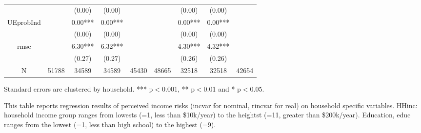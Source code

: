 \documentclass[12pt,notitlepage,onecolumn,aps,pra]{article}
\begin{document}
\begin{table}[p]
\begin{adjustbox}{width=\textwidth}
\begin{threeparttable}
\begin{tabular}{ccccccccc}
                 &           &    (0.00) &     (0.00) &             &           &     (0.00) &      (0.00) &              \\
UEprobInd        &           &   0.00*** &    0.00*** &             &           &    0.00*** &     0.00*** &              \\
                 &           &    (0.00) &     (0.00) &             &           &     (0.00) &      (0.00) &              \\
rmse             &           &   6.30*** &    6.32*** &             &           &    4.30*** &     4.32*** &              \\
                 &           &    (0.27) &     (0.27) &             &           &     (0.26) &      (0.26) &              \\
N                &     51788 &     34589 &      34589 &       45430 &     48665 &      32518 &       32518 &        42654 \\
\bottomrule
\end{tabular}
\begin{tablenotes}\item Standard errors are clustered by household. *** p$<$0.001, ** p$<$0.01 and * p$<$0.05. 
\item This table reports regression results of perceived income risks (incvar for nominal, rincvar for real) on household specific variables. HHinc: household income group ranges from lowests (=1, less than \$10k/year) to the heightst (=11, greater than \$200k/year). Education, educ ranges from the lowest (=1, less than high school) to the highest (=9).
\end{tablenotes}
\end{threeparttable}
\end{adjustbox}
\end{table}
\end{document}
